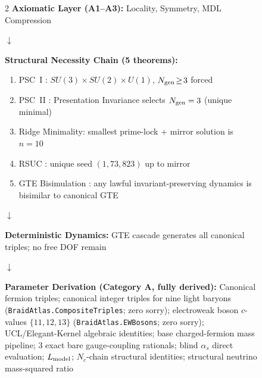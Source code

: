 \documentclass[11pt]{article}
\theoremstyle{remark}
\begin{document}
\begin{figure}[p]
\begin{tcolorbox}[colback=gray!7,colframe=black!40,title={\textbf{Axioms $\boldsymbol{\to}$ SM Parameters: Constructive Pipeline}},fonttitle=\small\bfseries,left=6pt,right=6pt,top=4pt,bottom=4pt]
\small
\setlength{\columnsep}{1.4em}%
\begin{multicols}{2}
\textbf{Axiomatic Layer (A1--A3):} Locality, Symmetry, MDL Compression

$\downarrow$

\textbf{Structural Necessity Chain (5 theorems):}
\begin{enumerate}[leftmargin=1.2em,itemsep=0.05em,topsep=2pt]
  \item PSC~I \cite{SpivackNEMS05}: $SU(3)\!\times\!SU(2)\!\times\!U(1)$, $N_{\rm gen}\!\ge\!3$ forced
  \item PSC~II \cite{SpivackNEMS05}: Presentation Invariance selects $N_{\rm gen}=3$ (unique minimal)
  \item Ridge Minimality: smallest prime-lock + mirror solution is $n=10$
  \item RSUC \cite{SpivackUnifiedRigidity,SpivackUGPFormalization}: unique seed $(1,73,823)$ up to mirror
  \item GTE Bisimulation \cite{SpivackUGPFormalization}: any lawful invariant-preserving dynamics is bisimilar to canonical GTE
\end{enumerate}

$\downarrow$

\textbf{Deterministic Dynamics:} GTE cascade generates all canonical triples; no free DOF remain

\columnbreak

$\downarrow$

\textbf{Parameter Derivation (Category A, fully derived):}
Canonical fermion triples; canonical integer triples for nine light baryons (\texttt{BraidAtlas.CompositeTriples}; zero sorry); electroweak boson $c$-values $\{11,12,13\}$ (\texttt{BraidAtlas.EWBosons}; zero sorry); UCL/Elegant-Kernel algebraic identities; base charged-fermion mass pipeline; 3 exact bare gauge-coupling rationals; blind $\alpha_s$ direct evaluation; $L_{\rm model}$; $N_c$-chain structural identities; structural neutrino mass-squared ratio


\end{multicols}
\end{tcolorbox}
\end{figure}
\end{document}
